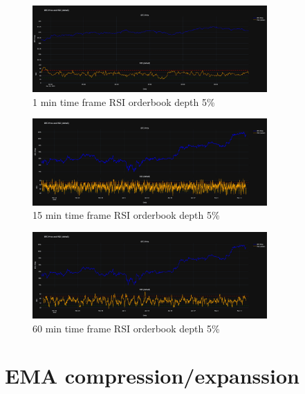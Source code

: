 \documentclass[12pt]{article}
\begin{document}
\begin{figure}[H]
    \centering
    \includegraphics[width=0.8\textwidth]{imgs/RSI1min.png}
    \caption{1 min time frame RSI orderbook depth 5\%}    
\end{figure}
\begin{figure}[H]
    \centering
    \includegraphics[width=0.8\textwidth]{imgs/15minRsi.png}
    \caption{15 min time frame RSI orderbook depth 5\%}
\end{figure}

\begin{figure}[H]
    \centering
    \includegraphics[width=0.8\textwidth]{imgs/60minRSI.png}
    \caption{60 min time frame RSI orderbook depth 5\%}
\end{figure}




\section*{EMA compression/expanssion}
\end{document}
